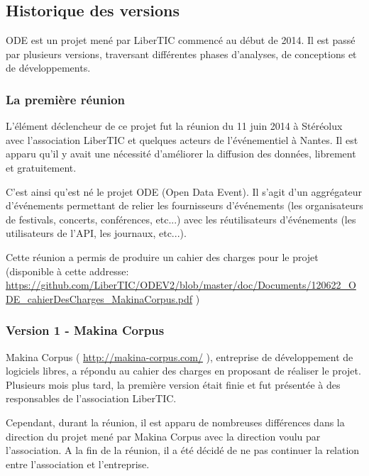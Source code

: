 
\subsection{Historique des versions}

ODE est un projet mené par LiberTIC commencé au début de 2014. Il est passé par plusieurs versions, traversant différentes phases d'analyses, de conceptions et de développements.

\subsubsection*{La première réunion}

L'élément déclencheur de ce projet fut la réunion du 11 juin 2014 à Stéréolux avec l'association LiberTIC et quelques acteurs de l'événementiel à Nantes. Il est apparu qu'il y avait une nécessité d'améliorer la diffusion des données, librement et gratuitement.

C'est ainsi qu'est né le projet ODE (Open Data Event). Il s'agit d'un aggrégateur d'événements permettant de relier les fournisseurs d'événements (les organisateurs de festivals, concerts, conférences, etc...) avec les réutilisateurs d'événements (les utilisateurs de l'API, les journaux, etc...).

Cette réunion a permis de produire un cahier des charges pour le projet (disponible à cette addresse: \url{https://github.com/LiberTIC/ODEV2/blob/master/doc/Documents/120622_ODE_cahierDesCharges_MakinaCorpus.pdf} )

\subsubsection*{Version 1 - Makina Corpus}

Makina Corpus ( \url{http://makina-corpus.com/} ), entreprise de développement de logiciels libres, a répondu au cahier des charges en proposant de réaliser le projet. Plusieurs mois plus tard, la première version était finie et fut présentée à des responsables de l'association LiberTIC.

Cependant, durant la réunion, il est apparu de nombreuses différences dans la direction du projet mené par Makina Corpus avec la direction voulu par l'association. A la fin de la réunion, il a été décidé de ne pas continuer la relation entre l'association et l'entreprise.

